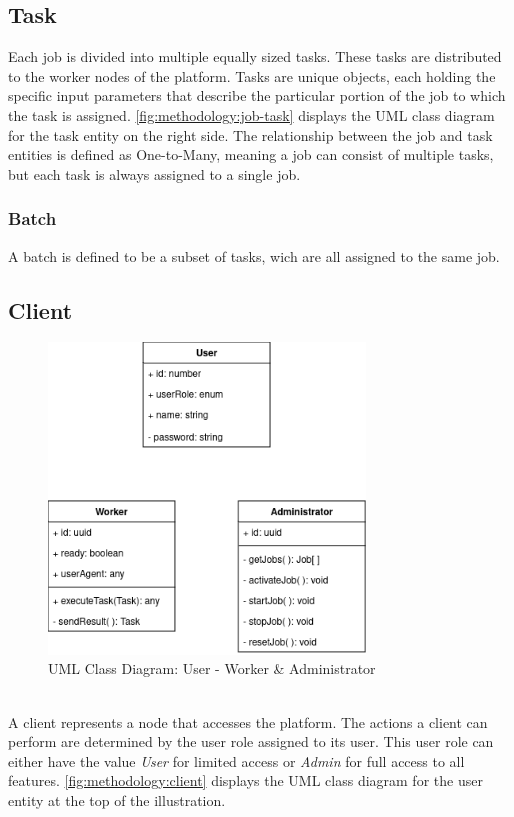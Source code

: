 \subsection{Task}
\label{subsec:methodology:entities:task}
Each job is divided into multiple equally sized tasks. These tasks are distributed to the worker nodes of the platform. Tasks are unique objects, each holding the specific input parameters that describe the particular portion of the job to which the task is assigned. \autoref{fig:methodology:job-task} displays the \ac{UML} class diagram for the task entity on the right side. The relationship between the job and task entities is defined as One-to-Many, meaning a job can consist of multiple tasks, but each task is always assigned to a single job.

\subsubsection{Batch}
\label{ssubsec:methodology:entities:task:batch}
A batch is defined to be a subset of tasks, wich are all assigned to the same job.

\subsection{Client}
\label{subsec:methodology:entities:client}
\begin{figure}[htbp]
  \centering
  \includegraphics[width=0.75\textwidth]{gfx/figures/Client.png}
  \caption{\ac{UML} Class Diagram: User - Worker \& Administrator}
  \label{fig:methodology:client}
\end{figure}
~\\
A client represents a node that accesses the platform. The actions a client can perform are determined by the user role assigned to its user. This user role can either have the value \emph{User} for limited access or \emph{Admin} for full access to all features. \autoref{fig:methodology:client} displays the \ac{UML} class diagram for the user entity at the top of the illustration.

